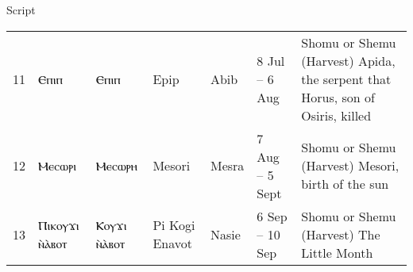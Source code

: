 \begin{table}[p]
\begin{scriptexample}[\arial]{Script}
{\begin{tabular}{l >{\pan}p{1.3cm} >{\pan\raggedright }p{1.3cm} >{\raggedright}p{1.3cm} l l >{\RaggedRight}p{3cm}}
11	&Ⲉⲡⲓⲡ	 &Ⲉⲡⲓⲡ	  &Epip	&Abib	&8 Jul – 6 Aug	&Shomu or Shemu (Harvest)	Apida, the serpent that Horus, son of Osiris, killed\\

12	&Ⲙⲉⲥⲱⲣⲓ	&Ⲙⲉⲥⲱⲣⲏ	&Mesori	&Mesra	 &7 Aug – 5 Sept	&Shomu or Shemu (Harvest)	Mesori, birth of the sun\\

13	&Ⲡⲓⲕⲟⲩϫⲓ  ⲛ̀ⲁ̀ⲃⲟⲧ	&Ⲕⲟⲩϫⲓ  ⲛ̀ⲁ̀ⲃⲟⲧ	 &Pi Kogi Enavot	&Nasie	&6 Sep – 10 Sep &	Shomu or Shemu (Harvest)	The Little Month  \\                

\bottomrule    
\end{tabular}

}
\vspace*{3cm}
\end{scriptexample}

\end{table}









                  
                  
                  
                  